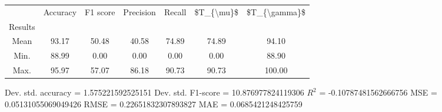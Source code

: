 \begin{tabular}{|c|c|c|c|c|c|c|}
\toprule
{} &  Accuracy &  F1 score &  Precision &  Recall &  \$T\_\{\textbackslash mu\}\$ &  \$T\_\{\textbackslash gamma\}\$ \\
Results &           &           &            &         &            &               \\
\hline
Mean    &     93.17 &     50.48 &      40.58 &   74.89 &      74.89 &         94.10 \\
Min.    &     88.99 &      0.00 &       0.00 &    0.00 &       0.00 &         88.90 \\
Max.    &     95.97 &     57.07 &      86.18 &   90.73 &      90.73 &        100.00 \\
\bottomrule
\end{tabular}

 Dev. std. accuracy = 1.575221592525151
 Dev. std. F1-score = 10.876977824119306
 $R^2$ = -0.10787481562666756
 MSE = 0.05131055069049426
 RMSE = 0.22651832307893827
 MAE = 0.0685421248425759